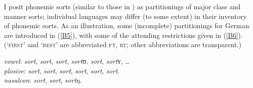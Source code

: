 \documentclass[output=paper]{langsci/langscibook}
\begin{document}
I posit phonemic sorts (similar to those in \citealt{mast:93}) as partitionings of major class and manner sorts; individual
languages may differ (to some extent) in their inventory of phonemic sorts.
As an illustration, some (incomplete) partitionings for German
are introduced in (\ref{B5}), with some of the attending restrictions given
in (\ref{B6}).  (`\textsc{first}' and `\textsc{rest}' are abbreviated \textsc{ft},
\textsc{rt}; other abbreviations are transparent.)
%
\begin{exe}
\ex
\label{B5}
  \textit{vowel}\/: \textit{sort}{\textunderscore}, \textit{sort}{\textunderscore}, \textit{sort}{\textunderscore}, \textit{sort}{\textunderscore}ʊ, \textit{sort}{\textunderscore},
  \textit{sort}{\textunderscore}ʏ, \ldots \\
  \textit{plosive}\/: \textit{sort}{\textunderscore}, \textit{sort}{\textunderscore}, \textit{sort}{\textunderscore}, \textit{sort}{\textunderscore}, \textit{sort}{\textunderscore}, \textit{sort}{\textunderscore}.\\
  \textit{nasalcon}\/: \textit{sort}{\textunderscore}, \textit{sort}{\textunderscore}, \textit{sort}{\textunderscore}ŋ.
\end{exe}
% 
\end{document}
